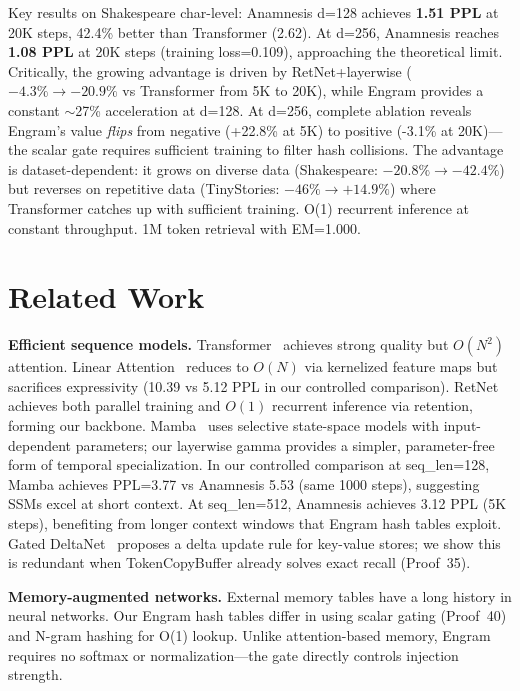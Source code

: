 \documentclass[twocolumn]{article}
\begin{document}
Key results on Shakespeare char-level: Anamnesis d=128 achieves \textbf{1.51 PPL} at 20K steps, 42.4\% better than Transformer (2.62). At d=256, Anamnesis reaches \textbf{1.08 PPL} at 20K steps (training loss=0.109), approaching the theoretical limit. Critically, the growing advantage is driven by RetNet+layerwise ($-4.3\% \to -20.9\%$ vs Transformer from 5K to 20K), while Engram provides a constant $\sim$27\% acceleration at d=128. At d=256, complete ablation reveals Engram's value \emph{flips} from negative (+22.8\% at 5K) to positive (-3.1\% at 20K)---the scalar gate requires sufficient training to filter hash collisions. The advantage is dataset-dependent: it grows on diverse data (Shakespeare: $-20.8\% \to -42.4\%$) but reverses on repetitive data (TinyStories: $-46\% \to +14.9\%$) where Transformer catches up with sufficient training. O(1) recurrent inference at constant throughput. 1M token retrieval with EM=1.000.

\section{Related Work}

\textbf{Efficient sequence models.} Transformer~\cite{vaswani2017attention} achieves strong quality but $O(N^2)$ attention. Linear Attention~\cite{katharopoulos2020linear} reduces to $O(N)$ via kernelized feature maps but sacrifices expressivity (10.39 vs 5.12 PPL in our controlled comparison). RetNet~\cite{sun2023retnet} achieves both parallel training and $O(1)$ recurrent inference via retention, forming our backbone. Mamba~\cite{gu2023mamba} uses selective state-space models with input-dependent parameters; our layerwise gamma provides a simpler, parameter-free form of temporal specialization. In our controlled comparison at seq\_len=128, Mamba achieves PPL=3.77 vs Anamnesis 5.53 (same 1000 steps), suggesting SSMs excel at short context. At seq\_len=512, Anamnesis achieves 3.12 PPL (5K steps), benefiting from longer context windows that Engram hash tables exploit. Gated DeltaNet~\cite{deltanet2025} proposes a delta update rule for key-value stores; we show this is redundant when TokenCopyBuffer already solves exact recall (Proof~35).

\textbf{Memory-augmented networks.} External memory tables have a long history in neural networks. Our Engram hash tables differ in using scalar gating (Proof~40) and N-gram hashing for O(1) lookup. Unlike attention-based memory, Engram requires no softmax or normalization---the gate directly controls injection strength.
\end{document}
